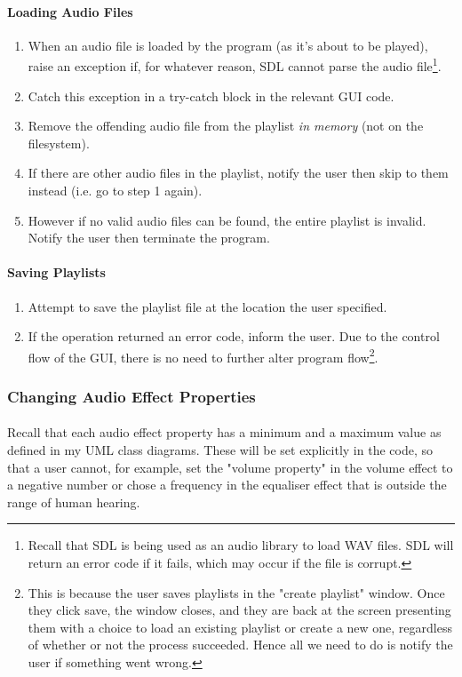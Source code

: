 \paragraph{Loading Audio Files}
\begin{enumerate}
	\item When an audio file is loaded by the program (as it's about to be played), raise an exception if, for whatever reason, SDL cannot parse the audio file\footnote{
		Recall that SDL is being used as an audio library to load WAV files. SDL will return an error
		code if it fails, which may occur if the file is corrupt.
	}.
	\item Catch this exception in a try-catch block in the relevant GUI code.
	\item Remove the offending audio file from the playlist \textit{in memory} (not on the filesystem).
	\item If there are other audio files in the playlist, notify the user then skip to them instead (i.e. go to step 1 again).
	\item However if no valid audio files can be found, the entire playlist is invalid. Notify the user then terminate the program.
\end{enumerate}

\paragraph{Saving Playlists}
\begin{enumerate}
	\item Attempt to save the playlist file at the location the user specified.
	\item If the operation returned an error code, inform the user. Due to the control flow of the GUI, there is no need to further alter program flow\footnote{
		This is because the user saves playlists in the "create playlist" window. Once they click save, the window closes, and they are back at the screen presenting them with a choice to load an existing playlist or create a new one, regardless of whether or not the process succeeded. Hence all we need to do is notify the user if something went wrong.
	}.
\end{enumerate}

\subsubsection{Changing Audio Effect Properties}
\paragraph{}
Recall that each audio effect property has a minimum and a maximum value as defined in my UML class diagrams. These will be set explicitly in the code, so that a user cannot, for example, set the "volume property" in the volume effect to a negative number or chose a frequency in the equaliser effect that is outside the range of human hearing.

